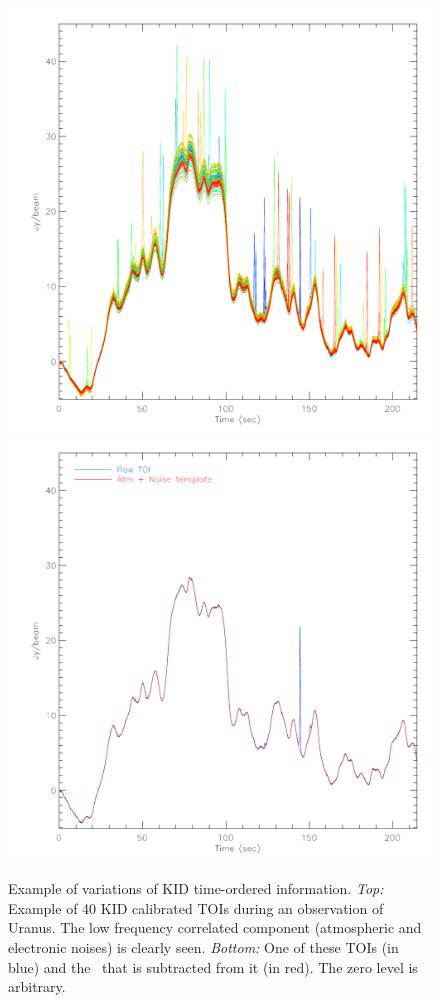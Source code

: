 \begin{figure}[ht!]
\begin{center}
\includegraphics[clip, angle=0, scale=0.4]{Figures/toi_plot-eps-converted-to.pdf}
\includegraphics[clip, angle=0, scale=0.4]{Figures/toi_plot_decorr-eps-converted-to.pdf}
\caption[Example of Time-Ordered-Information]{Example of variations of KID
  time-ordered information. \emph{Top:} Example of 40 KID {\lp calibrated} TOIs during an observation
  of Uranus. The low frequency correlated component (atmospheric and electronic
  noises) is clearly seen. \emph{Bottom:} One of these TOIs (in blue) and the
  \cm\ that is subtracted from it (in red). {\lp The zero level is arbitrary.}}
\label{fig:nika_toi}
\end{center}
\end{figure}

